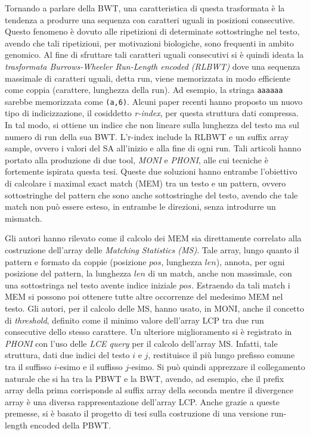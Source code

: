 \documentclass[a4paper,11pt, oneside,italian]{article}
\begin{document}
Tornando a parlare della BWT, una caratteristica di questa trasformata è la
tendenza a produrre una sequenza con caratteri uguali in posizioni
consecutive. Questo fenomeno è dovuto alle ripetizioni di determinate
sottostringhe nel testo, avendo che tali ripetizioni, per motivazioni
biologiche, sono frequenti in ambito genomico.
Al fine di sfruttare tali caratteri uguali consecutivi si 
è quindi ideata la \textit{trasformata Burrows-Wheeler Run-Length
  encoded (RLBWT)} dove una sequenza massimale di caratteri uguali, detta 
run, viene memorizzata in modo efficiente come coppia (carattere,
lunghezza della run). Ad esempio, la stringa \texttt{aaaaaa} sarebbe memorizzata
come \texttt{(a,6)}.
Alcuni paper recenti hanno proposto un nuovo tipo di
indicizzazione, il cosiddetto \textit{r-index}, per questa struttura
dati compressa. In tal modo, si ottiene un indice che non lineare sulla
lunghezza del testo ma sul numero di run della sua BWT. L'r-index include la
RLBWT e un suffix array sample, ovvero i valori del SA all’inizio e alla fine di
ogni run. 
Tali articoli hanno portato alla produzione di due tool, \textit{MONI} e 
\textit{PHONI}, alle cui tecniche è fortemente ispirata questa tesi. Queste due
soluzioni hanno entrambe l'obiettivo di 
calcolare i maximal exact match (MEM) tra un testo e un pattern, ovvero
sottostringhe del pattern che 
sono anche sottostringhe del testo, avendo che tale match non può essere esteso,
in entrambe le direzioni, senza introdurre un mismatch. 

Gli autori hanno rilevato come il calcolo dei MEM sia direttamente
correlato alla costruzione dell'array delle \textit{Matching Statistics (MS)}.
Tale array, lungo quanto il pattern e formato da coppie (posizione $pos$,
lunghezza $len$), annota, per ogni posizione del pattern, la lunghezza $len$ di
un match, anche non massimale, con una sottostringa nel testo avente
indice iniziale $pos$. Estraendo da tali match i MEM si possono poi ottenere
tutte altre occorrenze del medesimo MEM nel testo. 
Gli autori, per il calcolo delle MS, hanno
usato, in MONI, anche il concetto di \textit{threshold}, definito come
il minimo valore dell'array LCP tra due run consecutive dello stesso
carattere. Un ulteriore miglioramento si è registrato in \textit{PHONI} con
l'uso delle \textit{LCE query} per il calcolo dell'array MS. Infatti, tale
struttura, dati due indici del testo $i$ e $j$, restituisce il più lungo
prefisso comune tra il suffisso $i$-esimo e il suffisso $j$-esimo.
Si può quindi apprezzare il collegamento naturale che si ha tra la PBWT
e la BWT, avendo, ad esempio, che il prefix array della prima corrisponde
al suffix array della seconda mentre il divergence array è una
diversa rappresentazione dell'array LCP. Anche grazie a queste premesse, si è
basato il progetto di tesi sulla costruzione di una versione run-length encoded
della PBWT.
\end{document}
